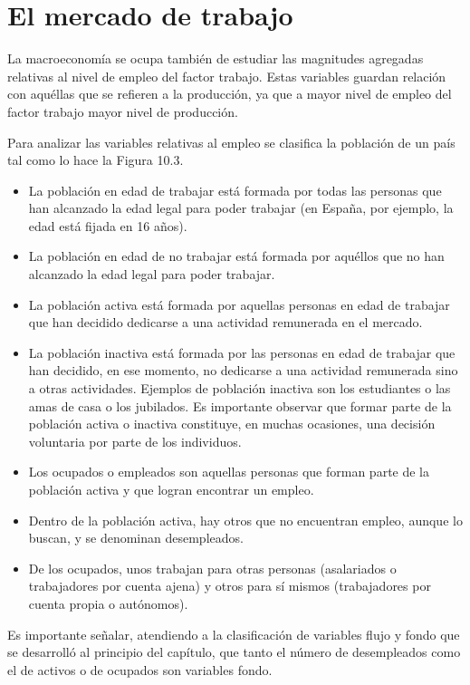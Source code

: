 \documentclass[
]{krantz}
\providecommand{\tightlist}{%
  \setlength{\itemsep}{0pt}\setlength{\parskip}{0pt}}
\begin{document}
\hypertarget{el-mercado-de-trabajo}{%
\section{El mercado de trabajo}\label{el-mercado-de-trabajo}}

La macroeconomía se ocupa también de estudiar las magnitudes agregadas relativas al nivel de empleo del factor trabajo. Estas variables guardan relación con aquéllas que se refieren a la producción, ya que a mayor nivel de empleo del factor trabajo mayor nivel de producción.

Para analizar las variables relativas al empleo se clasifica la población de un país tal como lo hace la Figura 10.3.

\begin{itemize}
\tightlist
\item
  La población en edad de trabajar está formada por todas las personas que han alcanzado la edad legal para poder trabajar (en España, por ejemplo, la edad está fijada en 16 años).
\item
  La población en edad de no trabajar está formada por aquéllos que no han alcanzado la edad legal para poder trabajar.
\item
  La población activa está formada por aquellas personas en edad de trabajar que han decidido dedicarse a una actividad remunerada en el mercado.
\item
  La población inactiva está formada por las personas en edad de trabajar que han decidido, en ese momento, no dedicarse a una actividad remunerada sino a otras actividades. Ejemplos de
  población inactiva son los estudiantes o las amas de casa o los jubilados. Es importante observar que formar parte de la población activa o inactiva constituye, en muchas ocasiones, una decisión voluntaria por parte de los individuos.
\item
  Los ocupados o empleados son aquellas personas que forman parte de la población activa y que logran encontrar un empleo.
\item
  Dentro de la población activa, hay otros que no encuentran empleo, aunque lo buscan, y se denominan desempleados.
\item
  De los ocupados, unos trabajan para otras personas (asalariados o trabajadores por cuenta ajena) y otros para sí mismos (trabajadores por cuenta propia o autónomos).
\end{itemize}

Es importante señalar, atendiendo a la clasificación de variables flujo y fondo que se desarrolló al principio del capítulo, que tanto el número de desempleados como el de activos o de ocupados son variables fondo.
\end{document}
